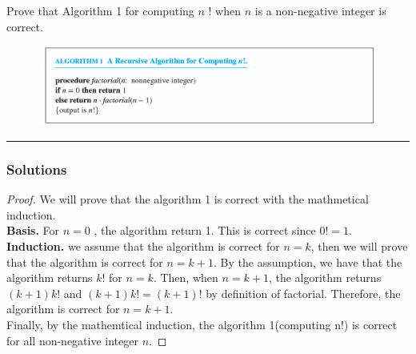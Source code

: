 \newpage
\begin{question}
Prove that Algorithm 1 for computing $n$ ! when $n$ is a non-negative integer is correct.

\begin{figure}[h!]
    \centering
    \includegraphics[width=\linewidth]{questions/Alg1.png}
\end{figure}

\end{question}

\par\noindent\rule{\textwidth}{0.5pt}

\subsubsection*{Solutions}

\begin{proof}
    We will prove that the algorithm 1 is correct with the mathmetical induction.\\
    \textbf{Basis.} For $n=0$ , the algorithm return 1. This is correct since $0!=1$.\\
    \textbf{Induction.} we assume that the algorithm is correct for $n=k$, then we will prove that the algorithm is correct for $n=k+1$. By the assumption, we have that the algorithm returns $k!$ for $n=k$. Then, when $n=k+1$, the algorithm returns $(k+1)k!$ and $(k+1)k! = (k+1)!$ by definition of factorial. Therefore, the algorithm is correct for $n=k+1$.\\
    Finally, by the mathemtical induction, the algorithm 1(computing n!) is correct for all non-negative integer $n$.
\end{proof}